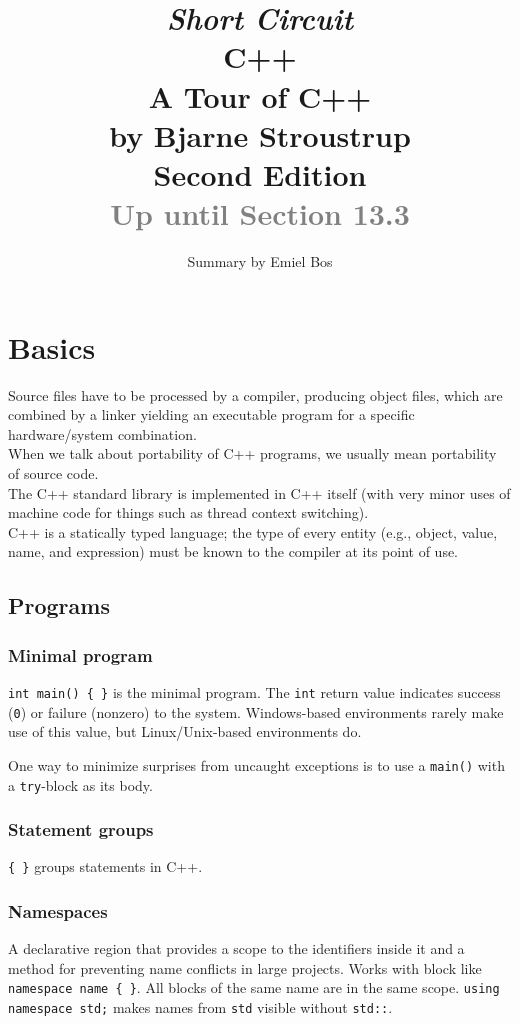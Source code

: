 \documentclass[8pt, table, xcdraw]{article}%
\title{
\textit{Short Circuit}\\
\vspace{15px}
\huge
C++\\
\vspace{20px}
\large
A Tour of C++\\
by Bjarne Stroustrup\\
Second Edition\\
\textcolor{gray}{Up until Section 13.3}
}
\author{Summary by Emiel Bos}
\date{}
\begin{document}
\maketitle

\section{Basics}

Source files have to be processed by a compiler, producing object files, which are combined by a linker yielding an executable program for a specific hardware/system combination.\\
When we talk about portability of C++ programs, we usually mean portability of source code.\\
The C++ standard library is implemented in C++ itself (with very minor uses of machine code for things such as thread context switching).\\
C++ is a statically typed language; the type of every entity (e.g., object, value, name, and expression) must be known to the compiler at its point of use.

\subsection{Programs}

\subsubsection{Minimal program}
\lstinline|int main() { }| is the minimal program.
The \lstinline{int} return value indicates success (\lstinline{0}) or failure (nonzero) to the system. Windows-based environments rarely make use of this value, but Linux/Unix-based environments do.

One way to minimize surprises from uncaught exceptions is to use a \lstinline{main()} with a \lstinline{try}-block as its body.

\subsubsection{Statement groups}
\lstinline|{ }| groups statements in C++.

\subsubsection{Namespaces}
A declarative region that provides a scope to the identifiers inside it and a method for preventing name conflicts in large projects. Works with block like \lstinline|namespace name { }|. All blocks of the same name are in the same scope. \lstinline{using namespace std;} makes names from \lstinline{std} visible without \lstinline{std::}.
\end{document}
